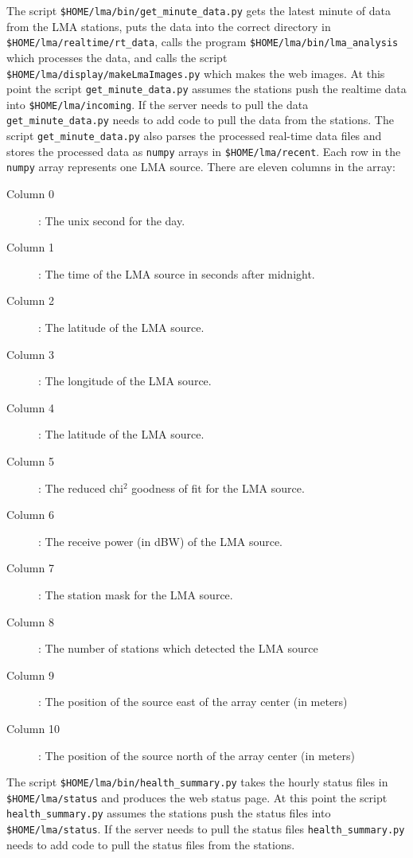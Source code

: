 \documentclass[12pt]{article}
\begin{document}
The script {\tt \$HOME/lma/bin/get\_minute\_data.py} gets the latest minute of data from the
LMA stations, puts the data into the correct directory in {\tt \$HOME/lma/realtime/rt\_data}, 
calls the program {\tt \$HOME/lma/bin/lma\_analysis} which processes the data, and calls the
script {\tt \$HOME/lma/display/makeLmaImages.py} which makes the web images.  At this point
the script {\tt get\_minute\_data.py} assumes the stations push the realtime data into 
{\tt \$HOME/lma/incoming}.  If the server needs to pull the data {\tt get\_minute\_data.py}
needs to add code to pull the data from the stations.  The script \verb+get_minute_data.py+ also parses the processed real-time data files and
stores the processed data as \verb+numpy+ arrays in \verb+$HOME/lma/recent+.  Each row in the \verb+numpy+ array represents one LMA source.
There are eleven columns in the array:
\begin{description}
\item [Column 0]: The unix second for the day.
\item [Column 1]: The time of the LMA source in seconds after midnight.
\item [Column 2]: The latitude of the LMA source.
\item [Column 3]: The longitude of the LMA source.
\item [Column 4]: The latitude of the LMA source.
\item [Column 5]: The reduced chi$^2$ goodness of fit for the LMA source.
\item [Column 6]: The receive power (in dBW) of the LMA source.
\item [Column 7]: The station mask for the LMA source.
\item [Column 8]: The number of stations which detected the LMA source
\item [Column 9]: The position of the source east of the array center (in meters)
\item [Column 10]: The position of the source north of the array center (in meters)
\end{description}

The script {\tt \$HOME/lma/bin/health\_summary.py} takes the hourly status files in 
{\tt \$HOME/lma/status} and produces the web status page.  At this point
the script {\tt health\_summary.py} assumes the stations push the status files into 
{\tt \$HOME/lma/status}.  If the server needs to pull the status files {\tt health\_summary.py}
needs to add code to pull the status files from the stations.
\end{document}
